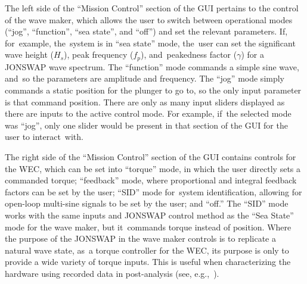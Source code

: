 \documentclass[hardware,article,submit,pdftex,moreauthors]{Definitions/mdpi}
\begin{document}
The left side of the ``Mission Control'' section of the GUI pertains to the control of the wave maker, which allows the user to switch between operational modes (``jog'', ``function'', ``sea state'', and ``off'') and set the relevant parameters.
If, for~example, the~system is in ``sea state'' mode, the~user can set the significant wave height ($H_s$), peak frequency ($f_p$), and~peakedness factor ($\gamma$) for a JONSWAP wave spectrum.
The ``function'' mode commands a simple sine wave, and~so the parameters are amplitude and frequency. 
The ``jog'' mode simply commands a static position for the plunger to go to, so the only input parameter is that command position.
There are only as many input sliders displayed as there are inputs to the active control mode. 
For example, if~the selected mode was ``jog'', only one slider would be present in that section of the GUI for the user to interact~with.

The right side of the ``Mission Control'' section of the GUI contains controls for the WEC, which can be set into ``torque'' mode, in which the user directly sets a commanded torque; ``feedback'' mode, where proportional and integral feedback factors can be set by the user; ``SID'' mode for~system identification, allowing for open-loop multi-sine signals to be set by the user; and ``off.''
The ``SID'' mode works with the same inputs and JONSWAP control method as the ``Sea State'' mode for the wave maker, but it~commands torque instead of position.
Where the purpose of the JONSWAP in the wave maker controls is to replicate a natural wave state, as~a torque controller for the WEC, its purpose is only to provide a wide variety of torque inputs. 
This is useful when characterizing the hardware using recorded data in post-analysis (see, e.g.,~\cite{Bacelli2017a}).
\end{document}
